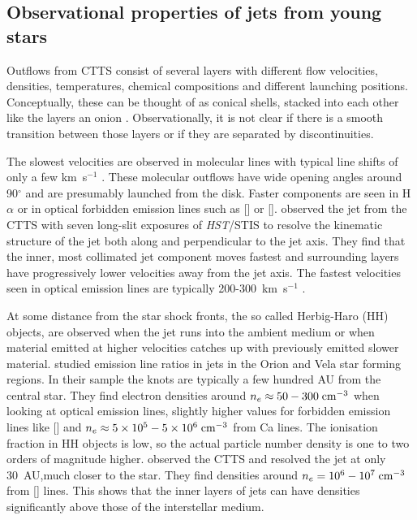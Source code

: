 \subsection{Observational properties of jets from young stars}

Outflows from CTTS consist of several layers with different flow velocities, densities, temperatures, chemical compositions and different launching positions. Conceptually, these can be thought of as conical shells, stacked into each other like the layers an onion \citep{2000ApJ...537L..49B}. Observationally, it is not clear if there is a smooth transition between those layers or if they are separated by discontinuities. 

The slowest velocities are observed in molecular lines with typical line shifts of only a few km~s$^{-1}$ \citep{2008ApJ...676..472B}. These molecular outflows have wide opening angles around 90$^{\circ}$ \citep[e.g.][]{2013A&A...557A.110S,2014A&A...564A..11A} and are presumably launched from the disk. Faster components are seen in H$\alpha$ or in optical forbidden emission lines such as [] or []. \citet{2000ApJ...537L..49B} observed the jet from the CTTS  with seven long-slit exposures of \emph{HST}/STIS to resolve the kinematic structure of the jet both along and perpendicular to the jet axis. They find that the inner, most collimated jet component moves fastest and surrounding layers have progressively lower velocities away from the jet axis. The fastest velocities seen in optical emission lines are typically 200-300~km~s$^{-1}$ \citep{2004Ap&SS.292..651B,2008ApJ...689.1112C,2013A&A...550L...1S}.

At some distance from the star shock fronts, the so called Herbig-Haro (HH) objects, are observed when the jet runs into the ambient medium or when material emitted at higher velocities catches up with previously emitted slower material. \citet{2006A&A...456..189P} studied emission line ratios in jets in the Orion and Vela star forming regions. In their sample the knots are typically a few hundred AU from the central star. They find electron densities around $n_e \approx 50-300 \textrm{\;cm}^{-3}$ when looking at optical emission lines, slightly higher values for forbidden emission lines like [] and $n_e \approx 5\times10^5-5\times10^6 \textrm{\;cm}^{-3}$ from Ca lines. The ionisation fraction in HH objects is low, so the actual particle number density is one to two orders of magnitude higher. \citet{2004ApJ...609..261H} observed the CTTS  and resolved the jet at only 30~AU,much closer to the star. They find densities around $n_e=10^6-10^7\textrm{\;cm}^{-3}$ from [] lines. This shows that the inner layers of jets can have densities significantly above those of the interstellar medium.